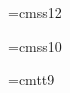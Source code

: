\font\secfont=cmss12
\def\section #1{
  \vskip\baselineskip
  \noindent{\secfont{}#1}
  \hfill\vskip\baselineskip
  \everypar={{\setbox0\lastbox}\everypar={}}}

\font\subsecfont=cmss10
\def\subsection #1{
  \vskip\baselineskip
  \noindent{\subsecfont{}#1}
  \hfill\vskip\baselineskip
  \everypar={{\setbox0\lastbox}\everypar={}}}

%
\font\ninett=cmtt9
\def\symbol{\begingroup\catcode`\_=12\relax\symbolimpl}
\def\symbolimpl#1{{\ninett #1}\endgroup}

\def\notespagesize{\hsize=5in{}\vsize=7in}
